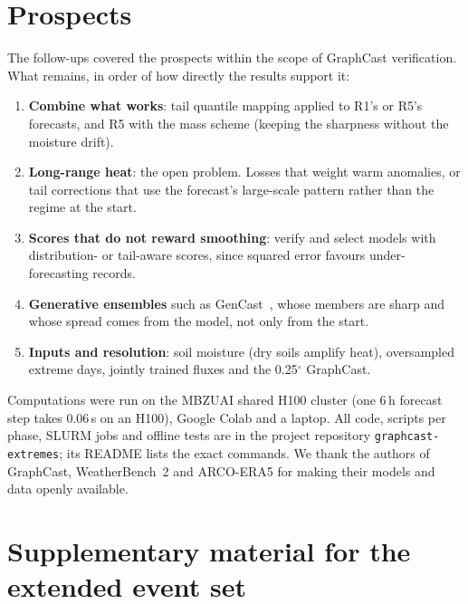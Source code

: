 \documentclass{article}
\newcommand{\R}[1]{\textsf{R#1}}
\begin{document}
\section{Prospects}
\label{sec:prospects}
The follow-ups covered the prospects within the scope of GraphCast verification. What remains, in order of how directly the results support it:
\begin{enumerate}[leftmargin=*]
  \item \textbf{Combine what works}: tail quantile mapping applied to \R{1}'s or \R{5}'s forecasts, and \R{5} with the mass scheme (keeping the sharpness without the moisture drift).
  \item \textbf{Long-range heat}: the open problem. Losses that weight warm anomalies, or tail corrections that use the forecast's large-scale pattern rather than the regime at the start.
  \item \textbf{Scores that do not reward smoothing}: verify and select models with distribution- or tail-aware scores, since squared error favours under-forecasting records.
  \item \textbf{Generative ensembles} such as GenCast~\cite{price2025gencast}, whose members are sharp and whose spread comes from the model, not only from the start.
  \item \textbf{Inputs and resolution}: soil moisture (dry soils amplify heat), oversampled extreme days, jointly trained fluxes and the 0.25$^\circ$ GraphCast.
\end{enumerate}

\begin{ack}
Computations were run on the MBZUAI shared H100 cluster (one 6\,h forecast step takes 0.06\,s on an H100), Google Colab and a laptop. All code, scripts per phase, SLURM jobs and offline tests are in the project repository \texttt{graphcast-extremes}; its README lists the exact commands. We thank the authors of GraphCast, WeatherBench~2 and ARCO-ERA5 for making
their models and data openly available.
\end{ack}




\appendix
\section{Supplementary material for the extended event set}
\label{app:ext}
\end{document}
